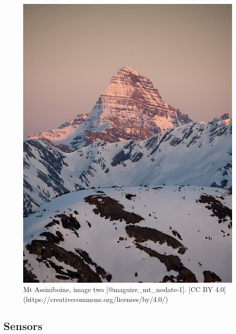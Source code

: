 \documentclass[
]{book}
\begin{document}
\begin{figure}
\includegraphics[width=0.9\linewidth]{images/12-assiniboine_sunset} \caption{Mt Assiniboine, image two [@maguire_mt_nodate-1]. [CC BY 4.0](https://creativecommons.org/licenses/by/4.0/)}\label{fig:12-assiniboine-sunset}
\end{figure}

\subsection{Sensors}\label{sensors}
\end{document}

